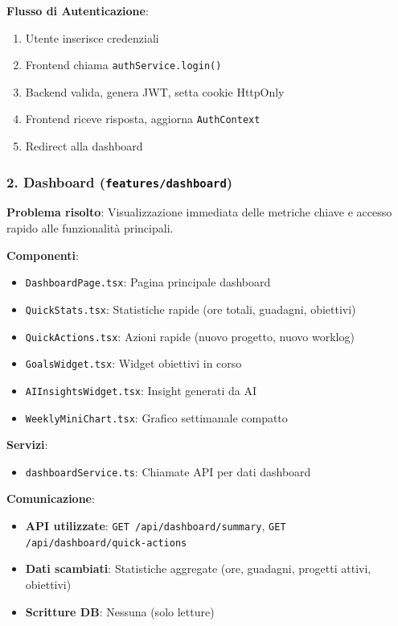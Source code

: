\documentclass[11pt,a4paper]{article}
\begin{document}
\textbf{Flusso di Autenticazione}:
\begin{enumerate}
    \item Utente inserisce credenziali
    \item Frontend chiama \texttt{authService.login()}
    \item Backend valida, genera JWT, setta cookie HttpOnly
    \item Frontend riceve risposta, aggiorna \texttt{AuthContext}
    \item Redirect alla dashboard
\end{enumerate}

\subsubsection{2. Dashboard (\texttt{features/dashboard})}

\textbf{Problema risolto}: Visualizzazione immediata delle metriche chiave e accesso rapido alle funzionalità principali.

\textbf{Componenti}:
\begin{itemize}
    \item \texttt{DashboardPage.tsx}: Pagina principale dashboard
    \item \texttt{QuickStats.tsx}: Statistiche rapide (ore totali, guadagni, obiettivi)
    \item \texttt{QuickActions.tsx}: Azioni rapide (nuovo progetto, nuovo worklog)
    \item \texttt{GoalsWidget.tsx}: Widget obiettivi in corso
    \item \texttt{AIInsightsWidget.tsx}: Insight generati da AI
    \item \texttt{WeeklyMiniChart.tsx}: Grafico settimanale compatto
\end{itemize}

\textbf{Servizi}:
\begin{itemize}
    \item \texttt{dashboardService.ts}: Chiamate API per dati dashboard
\end{itemize}

\textbf{Comunicazione}:
\begin{itemize}
    \item \textbf{API utilizzate}: \texttt{GET /api/dashboard/summary}, \texttt{GET /api/dashboard/quick-actions}
    \item \textbf{Dati scambiati}: Statistiche aggregate (ore, guadagni, progetti attivi, obiettivi)
    \item \textbf{Scritture DB}: Nessuna (solo letture)
\end{itemize}
\end{document}
